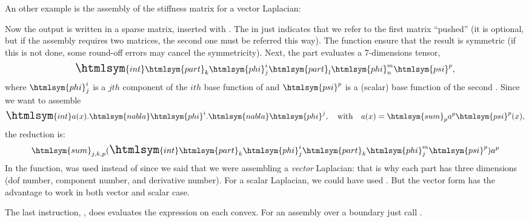 \documentclass[11pt,a4paper]{article}
\newcommand{\text}[1]{\mathrm{#1}}
\newcommand{\nabla}{\htmlsym{nabla}}%
\newcommand{\phi}{\htmlsym{phi}}
\newcommand{\varphi}{\htmlsym{phi}}
\newcommand{\psi}{\htmlsym{psi}}
\newcommand{\partial}{\htmlsym{part}}
\newcommand{\sum}{\htmlsym{sum}}
\newcommand{\int}{{\Large\htmlsym{int}}}
\begin{document}
An other example is the assembly of the stiffness matrix for a vector Laplacian:
Now the output is written in a sparse matrix, inserted with . The  in  just indicates that we refer to the first matrix ``pushed'' (it is optional, but if the assembly requires two matrices, the second one must be referred this way). The  function ensure that the result is symmetric (if this is not done, some round-off errors may cancel the symmetricity). Next, the  part evaluates a 7-dimensions tensor, 
\begin{equation*}\int\partial_k \varphi^{i}_{j} \partial_l \varphi^m_n \psi^p,\end{equation*}
where $\varphi^i_j$ is a $jth$ component of the $ith$ base function of  and $\psi^p$ is a (scalar) base function of the second . Since we want to assemble
\begin{equation*}\int a(x).\nabla\phi^i.\nabla\phi^j,\quad\text{with}\quad a(x)=\sum_pa^p\psi^p(x),\end{equation*}
the reduction is:
\begin{equation*}\sum_{j,k,p}\left(\int\partial_k\varphi^{i}_{j}\partial_k\varphi^m_j\psi^p\right)a^p\end{equation*}
In the  function,  was used instead of  since we
said that we were assembling a {\em vector} Laplacian: that is why
each  part has three dimensions (dof number, component
number, and derivative number). For a scalar Laplacian, we could have
used . But the
vector form has the advantage to work in both vector and scalar case.

The last instruction, , does evaluates
the expression on each convex. For an assembly over a boundary just
call .
\end{document}
